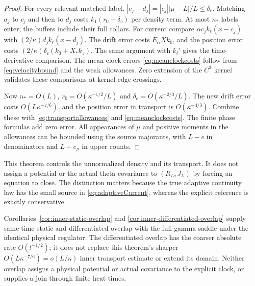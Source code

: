 \begin{proof}
For every relevant matched label,
$|c_j-d_j|=|c_j||\mu-L|/L\le\delta_c$.
Matching $a_j$ to $c_j$ and then to $d_j$ costs
$k_1(r_0+\delta_c)$ per density term. At most $n_*$ labels enter;
the buffers include their full collars.
For current compare $\alpha c_jk_\ell(x-c_j)$ with
$(2/\kappa)d_jk_\ell(x-d_j)$.
The drift error costs $E_\alpha Xk_0$, and the position error costs
$(2/\kappa)\delta_c(k_0+X_*k_1)$.
The same argument with $k_\ell'$ gives the time-derivative comparison.
The mean-clock errors \eqref{eq:meanclockcosts} follow from
\eqref{eq:velocitybound} and the weak allowances.
Zero extension of the $C^3$ kernel validates these comparisons at
kernel-edge crossings.

Now $n_*=O(L)$, $r_0=O(\kappa^{-1/2}/L)$ and
$\delta_c=O(\kappa^{-2/3}/L)$.
The new drift error costs $O(L\kappa^{-7/6})$, and the position error
in transport is $O(\kappa^{-4/3})$.
Combine these with \eqref{eq:transportallowances} and
\eqref{eq:meanclockcosts}. The finite phase formulas add zero error.
All appearances of $\mu$ and positive moments in the allowances can be
bounded using the source majorants, with $L-e$ in denominators and
$L+e_\mu$ in upper counts.
\end{proof}
This theorem controls the unnormalized density and its transport.
It does not assign a potential or the actual theta covariance to
$(R_L,J_L)$ by forcing an equation to close. The distinction matters
because the true adaptive continuity law has the small source in
\eqref{eq:adaptiveCurrent}, whereas the explicit reference is exactly
conservative.

Corollaries~\ref{cor:inner-static-overlap} and
\ref{cor:inner-differentiated-overlap} supply same-time static and
differentiated overlap with the full gamma saddle under the identical
physical regulator. The differentiated overlap has the coarser absolute
rate $O(t^{-1/2})$; it does not replace this theorem's sharper
$O(L\kappa^{-7/6})=o(L/\kappa)$ inner transport estimate or extend
its domain. Neither overlap assigns a physical potential or actual
covariance to the explicit clock, or supplies a join through finite
heat times.
